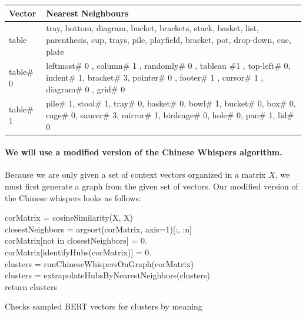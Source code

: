 \documentclass[a4paper,12pt,twoside,openright]{report}
\begin{document}
\begin{table}[H]
    \centering
    \begin{tabularx}{\textwidth}{p{50pt}|b}
    \toprule
      {\textbf{Vector}} & {\textbf{Nearest Neighbours}}  \\ \midrule
        table & tray, bottom, diagram, bucket, brackets, stack, basket, list, parenthesis, cup, trays, pile, playfield, bracket, pot, drop-down, cue, plate \\ \hline
        table\# 0 & leftmost\# 0 , column\# 1 , randomly\# 0 , tableau \#1 , top-left\# 0, indent\# 1, bracket\# 3, pointer\# 0 , footer\# 1 , cursor\# 1 , diagram\# 0 , grid\# 0      \\ \hline
        table\# 1 & pile\# 1, stool\# 1, tray\# 0, basket\# 0, bowl\# 1, bucket\# 0, box\# 0, cage\# 0, saucer\# 3, mirror\# 1, birdcage\# 0, hole\# 0, pan\# 1, lid\# 0    \\ \hline
    \end{tabularx}
\end{table}

\paragraph{We will use a modified version of the Chinese Whispers algorithm.}
Because we are only given a set of context vectors organized in a matrix $X$, we must first generate a graph from the given set of vectors.
Our modified version of the Chinese whispers looks as follows: \\

\begin{algorithm}[H]
\SetAlgoLined
{}

corMatrix = cosineSimilarity(X, X) \\
closestNeighbors = argsort(corMatrix, axis=1)[:, :n] \\
corMatrix[not in closestNeighbors] = 0. \\

corMatrix[identifyHubs(corMatrix)] = 0. \\

clusters = runChineseWhispersOnGraph(corMatrix) \\

clusters = extrapolateHubsByNearestNeighbors(clusters) \\

return clusters

 \caption{Checks sampled BERT vectors for clusters by  meaning}
\end{algorithm}
\end{document}
